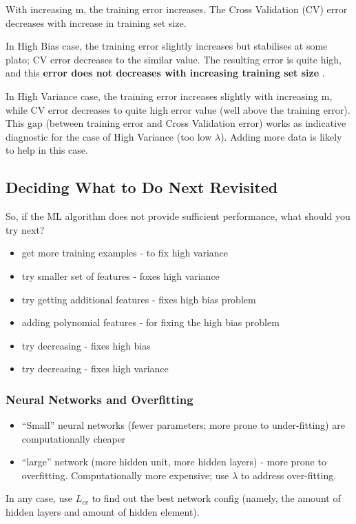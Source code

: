 \documentclass{scrartcl}
\begin{document}
With increasing m, the training error increases. The Cross Validation
(CV) error decreases with increase in training set size.

In High Bias case, the training error slightly increases but
stabilises at some plato; CV error decreases to the similar value. The
resulting error is quite high, and this {\bf error does not decreases
  with increasing training set size }.

In High Variance case, the training error increases slightly with
increasing m, while CV error decreases to quite high error value (well
above the training error). This gap (between training error and Cross
Validation error) works as indicative diagnostic for the case of High
Variance (too low $\lambda$). Adding more data is likely to help in
this case.

\subsection{Deciding What to Do Next Revisited}
\label{sec:10-7}

So, if the ML algorithm does not provide sufficient performance, what
should you try next?
\begin{itemize}
\item get more training examples - to fix high variance
\item try smaller set of features - foxes high variance
\item try getting additional features - fixes high bias problem
\item adding polynomial features - for fixing the high bias problem
\item try decreasing - fixes high bias
\item try decreasing - fixes high variance
\end{itemize}

\subsubsection{Neural Networks and Overfitting}
\label{sec:10-7-1}
\begin{itemize}
\item ``Small'' neural networks (fewer parameters; more prone to
  under-fitting) are computationally cheaper
\item ``large'' network (more hidden unit, more hidden layers) - more
  prone to overfitting. Computationally more expensive; use $\lambda$
  to address over-fitting.
\end{itemize}
In any case, use $L_{cv}$ to find out the best network config (namely,
the amount of hidden layers and amount of hidden element).
\end{document}
